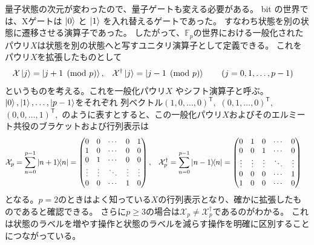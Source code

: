 \documentclass[../master.tex]{subfiles}
\begin{document}
量子状態の次元が変わったので、量子ゲートも変える必要がある。
bit の世界では、Xゲートは $\ket{0}$ と $\ket{1}$ を入れ替えるゲートであった。
すなわち状態を別の状態に遷移させる演算子であった。
したがって、$\mathbb{F}_p$の世界における一般化されたパウリ$X$は状態を別の状態へと写すユニタリ演算子として定義できる。
これをパウリ$X$を拡張したものとして
\begin{equation}\begin{aligned}[b]
    \mathcal{X}\ket{j} &= \ket{j+1 \pmod p}, &
    \mathcal{X}^\dagger \ket{j} &= \ket{j-1 \pmod p} \qquad (j=0,1,\ldots,p-1)
\end{aligned}\end{equation}
というものを考える。これを一般化パウリ$X$ やシフト演算子と呼ぶ。
$\ket{0},\ket{1},\ldots, \ket{p-1}$をそれぞれ
列ベクトル$(1,0,\ldots, 0)^\mathsf{T},$ $(0,1,\ldots, 0)^\mathsf{T},$ $(0,0,\ldots, 1)^\mathsf{T},$
のように表すとすると、この一般化パウリ$X$およびそのエルミート共役のブラケットおよび行列表示は
\begin{equation}\begin{aligned}[b]
    \mathcal{X}_p &= \sum_{n=0}^{p-1} \ketbra{n+1}{n}
    = \begin{pmatrix}
        0 & 0 & \cdots & 0 & 1 \\
        1 & 0 & \cdots & 0 & 0 \\
        0 & 1 & \cdots & 0 & 0 \\
        \vdots & \vdots & \ddots & \vdots & \vdots \\
        0 & 0 & \cdots & 1 & 0
    \end{pmatrix}, &
    \mathcal{X}_p^\dagger &= \sum_{n=0}^{p-1} \ketbra{n-1}{n}
    = \begin{pmatrix}
        0 & 1 & 0 & \cdots & 0 \\
        0 & 0 & 1 & \cdots & 0 \\
        \vdots & \vdots & \vdots & \ddots & \vdots \\
        0 & 0 & 0 & \cdots & 1\\
        1 & 0 & 0 & \cdots & 0
    \end{pmatrix}
\end{aligned}\end{equation}
となる。$p=2$のときはよく知っている$X$の行列表示となり、確かに拡張したものであると確認できる。
さらに$p\geq 3$の場合は$\mathcal{X}_p\neq \mathcal{X}_p^\dagger$であるのがわかる。
これは状態のラベルを増やす操作と状態のラベルを減らす操作を明確に区別することにつながっている。
\end{document}

